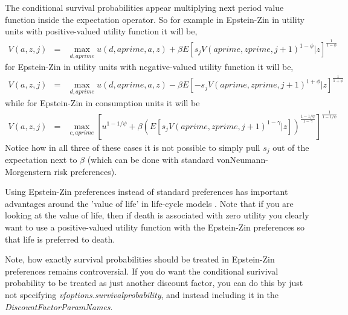 The conditional survival probabilities appear multiplying next period value function inside the expectation operator. So for example in Epstein-Zin in utility units with positive-valued utility function it will be,
\begin{eqnarray*}
 V(a,z,j)&=& \max_{d,aprime} u(d,aprime,a,z) + \beta E[ s_j V(aprime,zprime,j+1)^{1-\phi}|z]^{\frac{1}{1-\phi}}
\end{eqnarray*}
for Epstein-Zin in utility units with negative-valued utility function it will be,
\begin{eqnarray*}
 V(a,z,j)&=& \max_{d,aprime} u(d,aprime,a,z) - \beta E[ - s_j V(aprime,zprime,j+1)^{1+\phi}|z]^{\frac{1}{1+\phi}}
\end{eqnarray*}
while for Epstein-Zin in consumption units it will be
\begin{eqnarray*}
 V(a,z,j)&=& \max_{c,aprime} \left[ u^{1-1/\psi} + \beta  (E[ s_j V(aprime,zprime,j+1)^{1-\gamma}|z])^{\frac{1-1/\psi}{1-\gamma}}\right]^{\frac{1}{1-1/\psi}}
\end{eqnarray*}
Notice how in all three of these cases it is not possible to simply pull $s_j$ out of the expectation next to $\beta$ (which can be done with standard vonNeumann-Morgenstern risk preferences).

Using Epstein-Zin preferences instead of standard preferences has important advantages around the 'value of life' in life-cycle models \citep*{CordobaRipoll2017}. Note that if you are looking at the value of life, then if death is associated with zero utility you clearly want to use a positive-valued utility function with the Epstein-Zin preferences so that life is preferred to death.

Note, how exactly survival probabilities should be treated in Epstein-Zin preferences remains controversial. If you do want the conditional surivival probability to be treated as just another discount factor, you can do this by just not specifying \textit{vfoptions.survivalprobability}, and instead including it in the \textit{DiscountFactorParamNames}.

